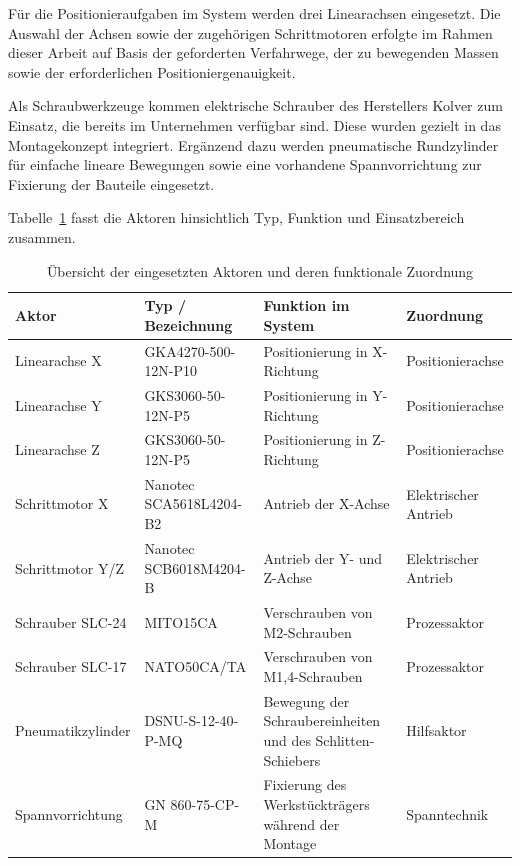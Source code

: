 Für die Positionieraufgaben im System werden drei Linearachsen eingesetzt. Die Auswahl der Achsen sowie der zugehörigen Schrittmotoren erfolgte im Rahmen dieser Arbeit auf Basis der geforderten Verfahrwege, der zu bewegenden Massen sowie der erforderlichen Positioniergenauigkeit.

Als Schraubwerkzeuge kommen elektrische Schrauber des Herstellers Kolver zum Einsatz, die bereits im Unternehmen verfügbar sind. Diese wurden gezielt in das Montagekonzept integriert. Ergänzend dazu werden pneumatische Rundzylinder für einfache lineare Bewegungen sowie eine vorhandene Spannvorrichtung zur Fixierung der Bauteile eingesetzt.

Tabelle~\ref{tab:aktoren_uebersicht} fasst die Aktoren hinsichtlich Typ, Funktion und Einsatzbereich zusammen.\cite{ds_gmt_gka_gks,ds_nanotec_sca5618,ds_nanotec_scb6018,ds_kolver_mito15ca,ds_kolver_nato50ca,ds_kolver_edu2ae,ds_festo_dsnu,ds_gn860}

\begin{table}[H]
\centering
\small
\setlength{\tabcolsep}{4pt}
\renewcommand{\arraystretch}{1.2}
\begin{tabular}{|p{3.0cm}|p{4.8cm}|p{4.0cm}|p{2.8cm}|}
\hline
\textbf{Aktor} & \textbf{Typ / Bezeichnung} & \textbf{Funktion im System} & \textbf{Zuordnung} \\
\hline
Linearachse X & GKA4270-500-12N-P10 & Positionierung in X-Richtung & Positionierachse \\
\hline
Linearachse Y & GKS3060-50-12N-P5 & Positionierung in Y-Richtung & Positionierachse \\
\hline
Linearachse Z & GKS3060-50-12N-P5 & Positionierung in Z-Richtung & Positionierachse \\
\hline
Schrittmotor X & Nanotec SCA5618L4204-B2 & Antrieb der X-Achse & Elektrischer Antrieb \\
\hline
Schrittmotor Y/Z & Nanotec SCB6018M4204-B & Antrieb der Y- und Z-Achse & Elektrischer Antrieb \\
\hline
Schrauber SLC-24 & MITO15CA & Verschrauben von M2-Schrauben & Prozessaktor \\
\hline
Schrauber SLC-17 & NATO50CA/TA & Verschrauben von M1{,}4-Schrauben & Prozessaktor \\
\hline
Pneumatikzylinder & DSNU-S-12-40-P-MQ & Bewegung der Schraubereinheiten und des Schlitten-Schiebers & Hilfsaktor \\
\hline
Spannvorrichtung & GN 860-75-CP-M & Fixierung des Werkstückträgers während der Montage & Spanntechnik \\
\hline
\end{tabular}
\caption{Übersicht der eingesetzten Aktoren und deren funktionale Zuordnung}
\label{tab:aktoren_uebersicht}
\end{table}

